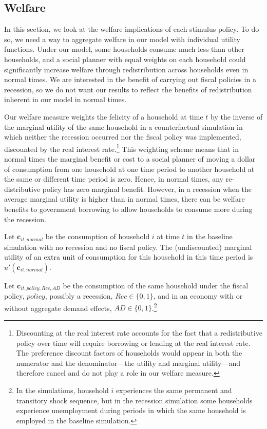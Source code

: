 \documentclass[\econtexRoot/HAFiscal]{subfiles}
\begin{document}
\hypertarget{welfare}{}\par\subsection{Welfare}
\notinsubfile{\label{sec:welfare}}

In this section, we look at the welfare implications of each stimulus policy. To do so, we need a way to aggregate welfare in our model with individual utility functions. Under our model, some households consume much less than other households, and a social planner with equal weights on each household could significantly increase welfare through redistribution across households even in normal times. We are interested in the benefit of carrying out fiscal policies in a recession, so we do not want our results to reflect the benefits of redistribution inherent in our model in normal times.

Our welfare measure weights the felicity of a household at time $t$ by the inverse of the marginal utility of the same household in a counterfactual simulation in which neither the recession occurred nor the fiscal policy was implemented, discounted by the real interest rate.\footnote{Discounting at the real interest rate accounts for the fact that a redistributive policy over time will require borrowing or lending at the real interest rate. The preference discount factors of households would appear in both the numerator and the denominator---the utility and marginal utility---and therefore cancel and do not play a role in our welfare measure.} This weighting scheme means that in normal times the marginal benefit or cost to a social planner of moving a dollar of consumption from one household at one time period to another household at the same or different time period is zero. Hence, in normal times, any re-distributive policy has zero marginal benefit. However, in a recession when the average marginal utility is higher than in normal times, there can be welfare benefits to government borrowing to allow households to consume more during the recession.

Let $\mathbf{c}_{it,\textit{normal}}$ be the consumption of household $i$ at time $t$ in the baseline simulation with no recession and no fiscal policy. The (undiscounted) marginal utility of an extra unit of consumption for this household in this time period is $ u'(\mathbf{c}_{it,\textit{normal}})$.

Let $\mathbf{c}_{it,\textit{policy},Rec,AD}$ be the consumption of the same household under the fiscal policy, $\textit{policy}$, possibly a recession, $Rec \in \{0,1\}$, and in an economy with or without aggregate demand effects, $AD \in \{0,1\}$.\footnote{In the simulations, household $i$ experiences the same permanent and transitory shock sequence, but in the recession simulation some households experience unemployment during periods in which the same household is employed in the baseline simulation.}
\end{document}
